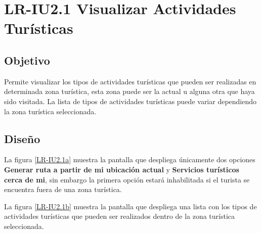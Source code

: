 \newpage
\section{LR-IU2.1 Visualizar Actividades Turísticas}

\subsection{Objetivo}
Permite visualizar los tipos de actividades turísticas que pueden ser realizadas en determinada zona turística, esta zona puede ser la actual u alguna otra que haya sido visitada. La lista de tipos de actividades turísticas puede variar dependiendo la zona turística seleccionada.

\subsection{Diseño}
La figura \ref{LR-IU2.1a} muestra la pantalla  que despliega únicamente dos opciones \textbf{Generar ruta a partir de mi ubicación actual} y \textbf{Servicios turísticos cerca de mi}, sin embargo la primera opción estará inhabilitada si el turista se encuentra fuera de una zona turística.


La figura \ref{LR-IU2.1b} muestra la pantalla  que despliega una lista con los tipos de actividades turísticas que pueden ser realizados dentro de la zona turística seleccionada.
